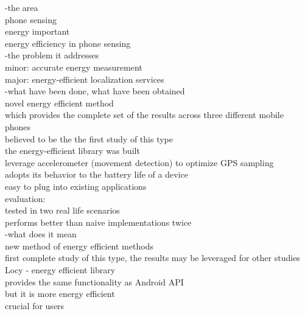 -the area\\
	phone sensing\\
	energy important\\
	energy efficiency in  phone sensing\\

-the problem it addresses\\
	minor: accurate energy measurement\\
	major: energy-efficient localization services\\
	

-what have been done, what have been obtained\\
	novel energy efficient method \\
	 	which provides the complete set of the results across three different mobile phones\\
	 	believed to be the the first study of this type\\
	the energy-efficient library was built\\
		leverage accelerometer (movement detection) to optimize GPS sampling\\
		adopts its behavior to the battery life of a device\\
		easy to plug into existing applications\\
		evaluation:\\
			tested in two real life scenarios\\
			performs better than naive implementations twice\\

-what does it mean\\
	new method of energy efficient methods\\
	first complete study of this type, the results may be leveraged for other studies\\
	Locy - energy efficient library \\
		provides the same functionality as Android API\\
		but it is more energy efficient\\
		crucial for users\\
	
	